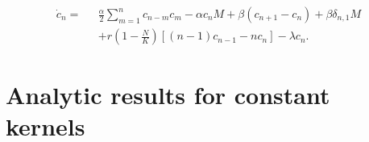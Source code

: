 \documentclass[12pt]{article}
\def\be{\begin{equation}}
\def\ee{\end{equation}}
\begin{document}


 





\begin{align}
\dot{c}_n = \text{ }& \frac{\alpha}{2}\sum_{m=1}^{n} c_{n-m}c_m - \alpha c_n M+\beta(c_{n+1}- c_n) + \beta\delta_{n,1}M\nonumber\\[6pt]
&+r\left(1-\frac{N}{K}\right)\left[(n-1)c_{n-1} - nc_n\right]  - \lambda c_n. 
\end{align}


\section*{Analytic results for constant kernels}
\end{document}
